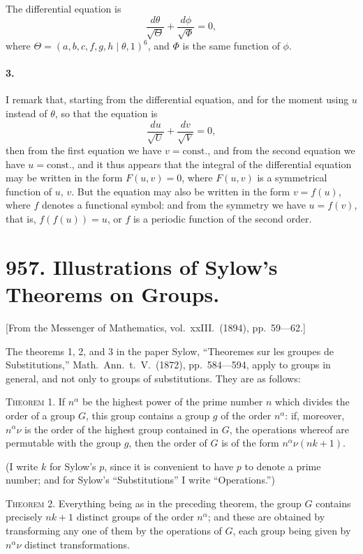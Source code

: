 \documentclass[11pt,a4paper]{article}
\theoremstyle{plain}
\begin{document}
The differential equation is
\[
\frac{d\theta}{\sqrt{\Theta}} + \frac{d\phi}{\sqrt{\Phi}} = 0,
\]
where $\Theta = (a, b, c, f, g, h\mid\theta, 1)^6$, and $\Phi$ is the same function of $\phi$.

\paragraph{3.} I remark that, starting from the differential equation, and for the moment using $u$ instead of $\theta$, so that the equation is
\[
\frac{du}{\sqrt{U}} + \frac{dv}{\sqrt{V}} = 0,
\]
then from the first equation we have $v = \text{const.}$, and from the second equation we have $u = \text{const.}$, and it thus appears that the integral of the differential equation may be written in the form $F(u, v) = 0$, where $F(u, v)$ is a symmetrical function of $u$, $v$. But the equation may also be written in the form $v = f(u)$, where $f$ denotes a functional symbol: and from the symmetry we have $u = f(v)$, that is, $f(f(u)) = u$, or $f$ is a periodic function of the second order.

\newpage

\section*{957. Illustrations of Sylow's Theorems on Groups.}

[From the Messenger of Mathematics, vol.~xxIII.~(1894), pp.~59---62.]

\bigskip

The theorems 1, 2, and 3 in the paper Sylow, ``Theoremes sur les groupes de Substitutions,'' Math.~Ann.~t.~V.~(1872), pp.~584---594, apply to groups in general, and not only to groups of substitutions. They are as follows:

\textsc{Theorem 1.} If $n^\alpha$ be the highest power of the prime number $n$ which divides the order of a group $G$, this group contains a group $g$ of the order $n^\alpha$: if, moreover, $n^\alpha\nu$ is the order of the highest group contained in $G$, the operations whereof are permutable with the group $g$, then the order of $G$ is of the form $n^\alpha\nu(nk+1)$.

(I write $k$ for Sylow's $p$, since it is convenient to have $p$ to denote a prime number; and for Sylow's ``Substitutions'' I write ``Operations.'')

\textsc{Theorem 2.} Everything being as in the preceding theorem, the group $G$ contains precisely $nk+1$ distinct groups of the order $n^\alpha$; and these are obtained by transforming any one of them by the operations of $G$, each group being given by $n^\alpha\nu$ distinct transformations.
\end{document}
